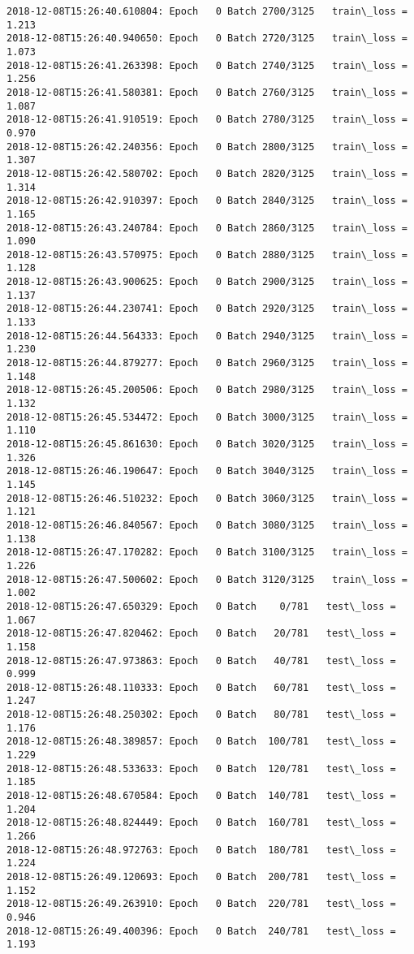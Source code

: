 \documentclass[11pt]{article}
\begin{document}
\begin{Verbatim}[commandchars=\\\{\}]
2018-12-08T15:26:40.610804: Epoch   0 Batch 2700/3125   train\_loss = 1.213
2018-12-08T15:26:40.940650: Epoch   0 Batch 2720/3125   train\_loss = 1.073
2018-12-08T15:26:41.263398: Epoch   0 Batch 2740/3125   train\_loss = 1.256
2018-12-08T15:26:41.580381: Epoch   0 Batch 2760/3125   train\_loss = 1.087
2018-12-08T15:26:41.910519: Epoch   0 Batch 2780/3125   train\_loss = 0.970
2018-12-08T15:26:42.240356: Epoch   0 Batch 2800/3125   train\_loss = 1.307
2018-12-08T15:26:42.580702: Epoch   0 Batch 2820/3125   train\_loss = 1.314
2018-12-08T15:26:42.910397: Epoch   0 Batch 2840/3125   train\_loss = 1.165
2018-12-08T15:26:43.240784: Epoch   0 Batch 2860/3125   train\_loss = 1.090
2018-12-08T15:26:43.570975: Epoch   0 Batch 2880/3125   train\_loss = 1.128
2018-12-08T15:26:43.900625: Epoch   0 Batch 2900/3125   train\_loss = 1.137
2018-12-08T15:26:44.230741: Epoch   0 Batch 2920/3125   train\_loss = 1.133
2018-12-08T15:26:44.564333: Epoch   0 Batch 2940/3125   train\_loss = 1.230
2018-12-08T15:26:44.879277: Epoch   0 Batch 2960/3125   train\_loss = 1.148
2018-12-08T15:26:45.200506: Epoch   0 Batch 2980/3125   train\_loss = 1.132
2018-12-08T15:26:45.534472: Epoch   0 Batch 3000/3125   train\_loss = 1.110
2018-12-08T15:26:45.861630: Epoch   0 Batch 3020/3125   train\_loss = 1.326
2018-12-08T15:26:46.190647: Epoch   0 Batch 3040/3125   train\_loss = 1.145
2018-12-08T15:26:46.510232: Epoch   0 Batch 3060/3125   train\_loss = 1.121
2018-12-08T15:26:46.840567: Epoch   0 Batch 3080/3125   train\_loss = 1.138
2018-12-08T15:26:47.170282: Epoch   0 Batch 3100/3125   train\_loss = 1.226
2018-12-08T15:26:47.500602: Epoch   0 Batch 3120/3125   train\_loss = 1.002
2018-12-08T15:26:47.650329: Epoch   0 Batch    0/781   test\_loss = 1.067
2018-12-08T15:26:47.820462: Epoch   0 Batch   20/781   test\_loss = 1.158
2018-12-08T15:26:47.973863: Epoch   0 Batch   40/781   test\_loss = 0.999
2018-12-08T15:26:48.110333: Epoch   0 Batch   60/781   test\_loss = 1.247
2018-12-08T15:26:48.250302: Epoch   0 Batch   80/781   test\_loss = 1.176
2018-12-08T15:26:48.389857: Epoch   0 Batch  100/781   test\_loss = 1.229
2018-12-08T15:26:48.533633: Epoch   0 Batch  120/781   test\_loss = 1.185
2018-12-08T15:26:48.670584: Epoch   0 Batch  140/781   test\_loss = 1.204
2018-12-08T15:26:48.824449: Epoch   0 Batch  160/781   test\_loss = 1.266
2018-12-08T15:26:48.972763: Epoch   0 Batch  180/781   test\_loss = 1.224
2018-12-08T15:26:49.120693: Epoch   0 Batch  200/781   test\_loss = 1.152
2018-12-08T15:26:49.263910: Epoch   0 Batch  220/781   test\_loss = 0.946
2018-12-08T15:26:49.400396: Epoch   0 Batch  240/781   test\_loss = 1.193

\end{Verbatim}
\end{document}
